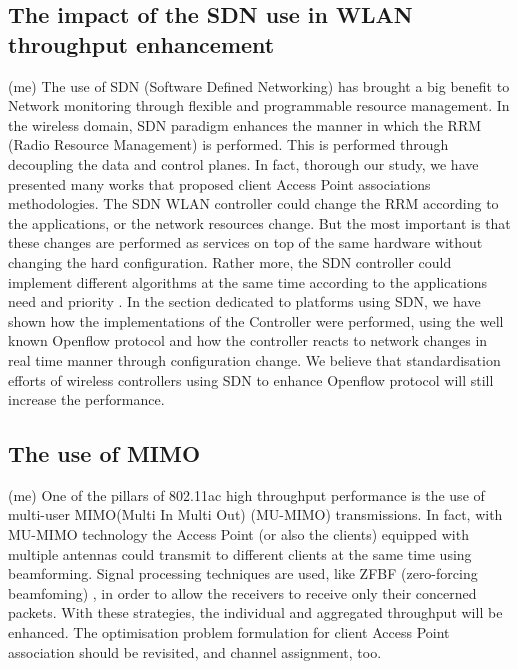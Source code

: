 \documentclass[journal,transmag]{IEEEtran}
\begin{document}
\subsection{The impact of the SDN use in WLAN throughput enhancement} (me)
The use of SDN (Software Defined Networking) has brought a big benefit to Network monitoring through flexible and programmable resource management. In the wireless domain, SDN paradigm enhances the manner in which the RRM (Radio Resource Management) is performed. This is performed through decoupling the data and control planes. In fact, thorough our study, we have presented many works that proposed client Access Point associations methodologies. The SDN WLAN controller could change the RRM according to the applications, or the network resources change. But the most important is that these changes are performed as services on top of the same hardware without changing the hard configuration. Rather more, the SDN controller could implement different algorithms at the same time according to the applications need and priority \cite{17QOS_AP_selection}. In the section dedicated to platforms using SDN, we have shown how the implementations of the Controller were performed, using the well known Openflow protocol \cite{15OpenSDWN_home_entreprise_WIFI,15SDN_scenarios_standard} and how the controller reacts to network changes in real time manner through configuration change. We believe that standardisation efforts of wireless controllers using SDN to enhance Openflow protocol will still increase the performance.  

\subsection{The use of MIMO} (me)
One of the pillars of 802.11ac high throughput performance is the use of multi-user MIMO(Multi In Multi 
Out) (MU-MIMO) transmissions. In fact, with MU-MIMO technology the Access Point (or also the clients) equipped with multiple antennas could transmit to different clients at the same time using beamforming. Signal processing techniques are used, like ZFBF (zero-forcing beamfoming) \cite{15AP_association_MIMO}, in order to allow the receivers to receive only their concerned packets. With these strategies, the individual and aggregated throughput will be enhanced. The optimisation problem formulation for client Access Point association should be revisited, and channel assignment, too.      
\end{document}
